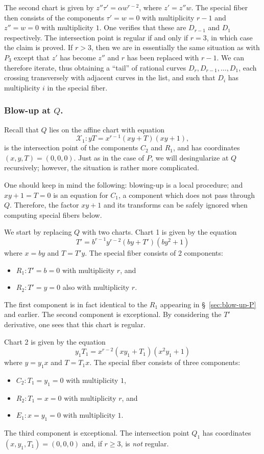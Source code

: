 \documentclass[reqno]{amsart}
\theoremstyle{definition}
\theoremstyle{remark}
\def\XX{\mathcal{X}}
\begin{document}
  The second chart is given by $z'' \tau' = \alpha w^{r-2}$, where $z' = z'' w$. The special fiber then consists of the components $\tau' = w = 0$ with multiplicity $r-1$ and $z'' = w = 0$ with multiplicity $1$. One verifies that these are $D_{r-1}$ and $D_1$ respectively. The intersection point is regular if and only if $r = 3$, in which case the claim is proved. If $r > 3$, then we are in essentially the same situation as with $P_3$ except that $z'$ has become $z''$ and $r$ has been replaced with $r-1$. We can therefore iterate, thus obtaining a ``tail'' of rational curves $D_r, D_{r-1}, \dots, D_1$, each crossing transversely with adjacent curves in the list, and such that $D_i$ has multiplicity $i$ in the special fiber.


\subsubsection{Blow-up at $Q$.}
\label{sec:blow-up-Q}

Recall that $Q$ lies on the affine chart with equation
\begin{equation}
  \XX_1:yT = x^{r-1}(xy + T)(xy + 1)\label{eq:C'''},
\end{equation}
is the intersection point of the components $C_2$ and $R_1$, and has coordinates $(x,y,T) = (0,0,0)$. Just as in the case of $P$, we will desingularize at $Q$ recursively; however, the situation is rather more complicated.  

One should keep in mind the following: blowing-up is a local procedure; and $xy + 1 = T = 0$ is an equation for $C_1$, a component which does not pass through $Q$. Therefore, the factor $xy + 1$ and its transforms can be safely ignored when computing special fibers below.

We start by replacing $Q$ with two charts. Chart 1 is given by the equation
\[
T' = b^{r-1}y^{r-2}(by + T')(by^2 + 1)
\]
where $x = by$ and $T = T'y$. The special fiber consists of 2 components:
\begin{itemize}
    \item $R_1: T' = b = 0$ with multiplicity $r$, and
    \item $R_2: T' = y = 0$ also with multiplicity $r$.
\end{itemize}
The first component is in fact identical to the $R_1$ appearing in \S~\ref{sec:blow-up-P} and earlier. The second component is exceptional. By considering the $T'$ derivative, one sees that this chart is regular.

Chart 2 is given by the equation
\[
y_1 T_1 = x^{r-2}(x y_1 + T_1)(x^2 y_1 + 1)
\]
where $y = y_1 x$ and $T = T_1 x$. The special fiber consists of three components:
\begin{itemize}
    \item $C_2: T_1 = y_1 = 0$ with multiplicity $1$,
    \item $R_2: T_1 = x = 0$ with multiplicity $r$, and
    \item $E_1: x = y_1 = 0$ with multiplicity $1$.
\end{itemize}
The third component is exceptional. The intersection point $Q_1$ has coordinates $(x, y_1, T_1) = (0,0,0)$ and, if $r \geq 3$, is \emph{not} regular.
\end{document}
